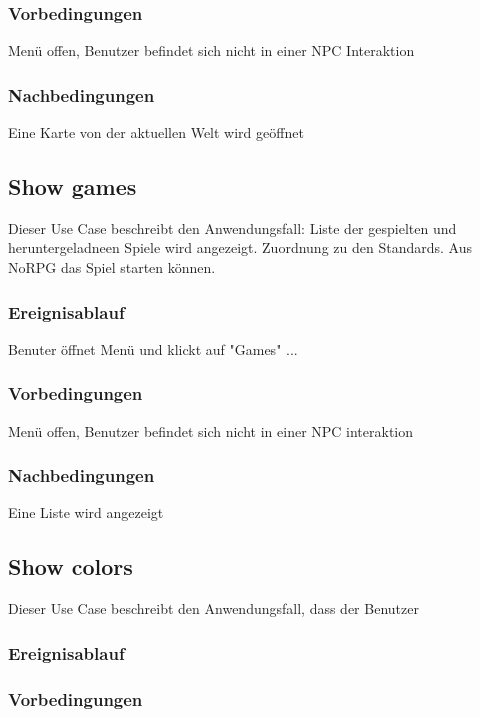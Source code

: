		\subsubsection{Vorbedingungen}
			Menü offen, Benutzer befindet sich nicht in einer NPC Interaktion
			
		\subsubsection{Nachbedingungen}
			Eine Karte von der aktuellen Welt wird geöffnet
	
	\subsection{Show games}
		Dieser Use Case beschreibt den Anwendungsfall: Liste der gespielten und heruntergeladneen Spiele wird angezeigt. Zuordnung zu den Standards. Aus NoRPG das Spiel starten können.
			
		\subsubsection{Ereignisablauf}
			Benuter öffnet Menü und klickt auf "Games" ...

		\subsubsection{Vorbedingungen}
			Menü offen, Benutzer befindet sich nicht in einer NPC interaktion
			
		\subsubsection{Nachbedingungen}
			Eine Liste wird angezeigt
	
	\subsection{Show colors}
		Dieser Use Case beschreibt den Anwendungsfall, dass der Benutzer 
			
		\subsubsection{Ereignisablauf}

		\subsubsection{Vorbedingungen}
			
